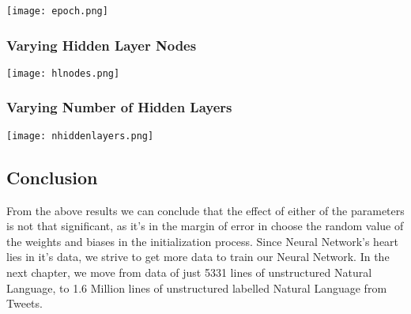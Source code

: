 \texttt{[image: epoch.png]}

\subsubsection{Varying Hidden Layer Nodes}

\texttt{[image: hlnodes.png]}

\subsubsection{Varying Number of Hidden Layers}

\texttt{[image: nhiddenlayers.png]}

\subsection{Conclusion}
From the above results we can conclude that the effect of either of the parameters is not that significant, as it's in the margin of error in choose the random value of the weights and biases in the initialization process. Since Neural Network's heart lies in it's data, we strive to get more data to train our Neural Network. In the next chapter, we move from data  of just 5331 lines of unstructured Natural Language, to 1.6 Million lines of unstructured labelled Natural Language from Tweets.